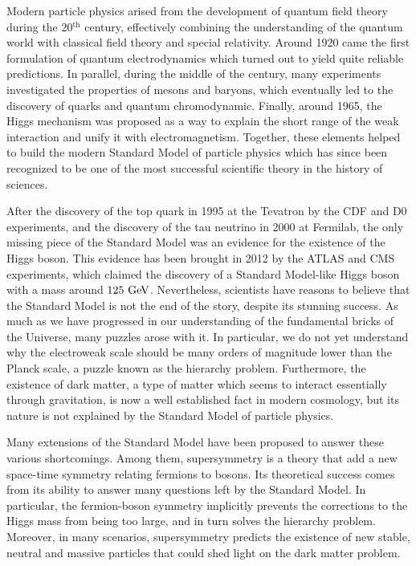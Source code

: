 Modern particle physics arised from the development of quantum field theory
during the 20$^\text{th}$ century, effectively combining the understanding of
the quantum world with classical field theory and special relativity. Around
1920 came the first formulation of quantum electrodynamics which turned out to
yield quite reliable predictions.  In parallel, during the middle of the
century, many experiments investigated the properties of mesons and baryons,
which eventually led to the discovery of quarks and quantum chromodynamic.
Finally, around 1965, the Higgs mechanism was proposed as a way to explain the
short range of the weak interaction and unify it with electromagnetism.
Together, these elements helped to build the modern Standard Model of particle
physics which has since been recognized to be one of the most successful
scientific theory in the history of sciences.

After the discovery of the top quark in 1995 at the Tevatron by the CDF and D0
experiments, and the discovery of the tau neutrino in 2000 at Fermilab, the only
missing piece of the Standard Model was an evidence for the existence of the
Higgs boson. This evidence has been brought in 2012 by the ATLAS and CMS
experiments, which claimed the discovery of a Standard Model-like Higgs boson
with a mass around $125~\text{GeV}$. Nevertheless, scientists have reasons to believe
that the Standard Model is not the end of the story, despite its stunning
success. As much as we have progressed in our understanding of the fundamental
bricks of the Universe, many puzzles arose with it. In particular, we do not yet
understand why the electroweak scale should be many orders of magnitude lower
than the Planck scale, a puzzle known as the hierarchy problem. Furthermore, the
existence of dark matter, a type of matter which seems to interact essentially
through gravitation, is now a well established fact in modern cosmology, but its
nature is not explained by the Standard Model of particle physics.

Many extensions of the Standard Model have been proposed to answer these various
shortcomings.  Among them, supersymmetry is a theory that add a new space-time
symmetry relating fermions to bosons. Its theoretical success comes from its
ability to answer many questions left by the Standard Model. In particular, the
fermion-boson symmetry implicitly prevents the corrections to the Higgs mass
from being too large, and in turn solves the hierarchy problem.  Moreover, in
many scenarios, supersymmetry predicts the existence of new stable, neutral and
massive particles that could shed light on the dark matter problem.

